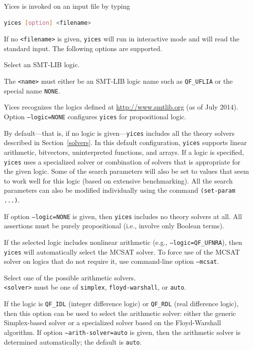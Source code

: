 \documentclass[11pt,twoside,fleqn,openright,titlepage]{cslreport}
\newenvironment{options}{
\begin{list}{}{
\setlength{\labelsep}{1.8ex}
\setlength{\labelwidth}{0pt}
\setlength{\itemindent}{-0.5\leftmargin}
\settowidth{\leftmargin}{\texttt{--}}
\renewcommand{\makelabel}{\optionlabel}}}
{\end{list}}
\newcommand*\optionlabel[1]{\hspace\labelsep\texttt{#1}}
\begin{document}
Yices is invoked on an input file by typing
\begin{lstlisting}[language=sh]
   yices [option] <filename>
\end{lstlisting}
If no \texttt{<filename>} is given, \texttt{yices} will run in
interactive mode and will read the standard input. The following
options are supported.
\begin{options}
\item[--logic=<name>] Select an SMT-LIB logic.

  The \texttt{<name>} must either be an SMT-LIB logic name such as
  \texttt{QF\_UFLIA} or the special name \texttt{NONE}.

  Yices recognizes the logics defined at \url{http://www.smtlib.org}
  (as of July 2014).  Option \texttt{--logic=NONE} configures
  \texttt{yices} for propositional logic.

  By default---that is, if no logic is given---\texttt{yices} includes
  all the  theory solvers described in  Section~\ref{solvers}. In this
  default  configuration, \texttt{yices}  supports  linear arithmetic,
  bitvectors,  uninterpreted  functions, and  arrays.  If  a logic  is
  specified, \texttt{yices}  uses a specialized  solver or combination
  of  solvers that is  appropriate for  the given  logic. Some  of the
  search parameters will also be set  to values that seem to work well
  for  this logic (based  on extensive  benchmarking). All  the search
  parameters  can  also be  modified  individually  using the  command
  \texttt{(set-param ...)}.

  If  option  \texttt{--logic=NONE}   is  given,  then  \texttt{yices}
  includes no  theory solvers  at all. All  assertions must  be purely
  propositional (i.e., involve only Boolean terms).

  If the selected logic includes nonlinear arithmetic (e.g.,
  \texttt{--logic=QF\_UFNRA}), then \texttt{yices} will automatically
  select the MCSAT solver. To force use of the MCSAT solver on logics
  that do not require it, use command-line option \texttt{--mcsat}.

\item[--arith-solver=<solver>] Select one of the possible arithmetic solvers.\\[1mm]
  \texttt{<solver>}     must    be     one     of    \texttt{simplex},
  \texttt{floyd-warshall}, or \texttt{auto}.

  If  the  logic is  \texttt{QF\_IDL}  (integer  difference logic)  or
  \texttt{QF\_RDL} (real  difference logic),  then this option  can be
  used   to  select   the  arithmetic   solver:  either   the  generic
  Simplex-based  solver   or  a   specialized  solver  based   on  the
  Floyd-Warshall algorithm.  If option \texttt{--arith-solver=auto} is
  given, then  the arithmetic solver is  determined automatically; the
  default is \texttt{auto}.


\end{options}
\end{document}
